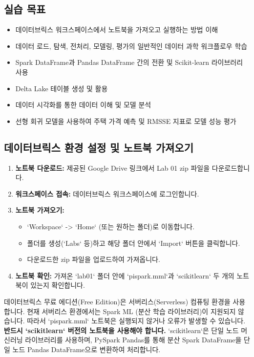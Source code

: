 \documentclass[11pt,a4paper]{article}
\begin{document}
\subsection{실습 목표}
\begin{itemize}
    \item 데이터브릭스 워크스페이스에서 노트북을 가져오고 실행하는 방법 이해
    \item 데이터 로드, 탐색, 전처리, 모델링, 평가의 일반적인 데이터 과학 워크플로우 학습
    \item Spark DataFrame과 Pandas DataFrame 간의 전환 및 Scikit-learn 라이브러리 사용
    \item Delta Lake 테이블 생성 및 활용
    \item 데이터 시각화를 통한 데이터 이해 및 모델 분석
    \item 선형 회귀 모델을 사용하여 주택 가격 예측 및 RMSSE 지표로 모델 성능 평가
\end{itemize}

\subsection{데이터브릭스 환경 설정 및 노트북 가져오기}
\begin{enumerate}
    \item \textbf{노트북 다운로드:} 제공된 Google Drive 링크에서 Lab 01 zip 파일을 다운로드합니다.
    \item \textbf{워크스페이스 접속:} 데이터브릭스 워크스페이스에 로그인합니다.
    \item \textbf{노트북 가져오기:}
    \begin{itemize}
        \item `Workspace` -> `Home` (또는 원하는 폴더)로 이동합니다.
        \item 폴더를 생성(`Labs` 등)하고 해당 폴더 안에서 `Import` 버튼을 클릭합니다.
        \item 다운로드한 zip 파일을 업로드하여 가져옵니다.
    \end{itemize}
    \item \textbf{노트북 확인:} 가져온 `lab01` 폴더 안에 `pispark.mml`과 `scikitlearn` 두 개의 노트북이 있는지 확인합니다.
\end{enumerate}

\begin{cautionbox}[cautionbox, title=중요: 서버리스 환경 제약사항]
데이터브릭스 무료 에디션(Free Edition)은 서버리스(Serverless) 컴퓨팅 환경을 사용합니다. 현재 서버리스 환경에서는 Spark ML (분산 학습 라이브러리)이 지원되지 않습니다. 따라서 `pispark.mml` 노트북은 실행되지 않거나 오류가 발생할 수 있습니다. \textbf{반드시 `scikitlearn` 버전의 노트북을 사용해야 합니다.} `scikitlearn`은 단일 노드 머신러닝 라이브러리를 사용하며, PySpark Pandas를 통해 분산 Spark DataFrame을 단일 노드 Pandas DataFrame으로 변환하여 처리합니다.
\end{cautionbox}
\end{document}
